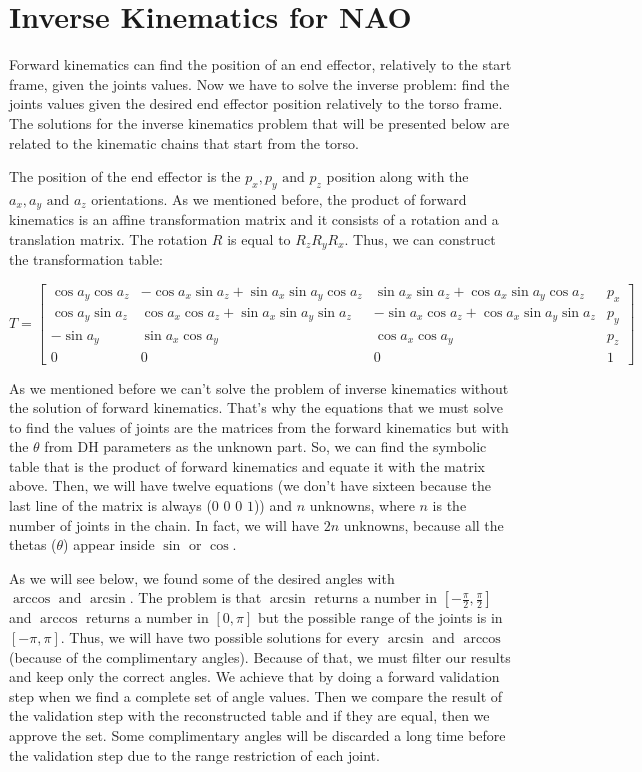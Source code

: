 \section{Inverse Kinematics for NAO}


Forward kinematics can find the position of an end effector, relatively to the start frame, given the joints values. Now we have to solve the inverse problem: find the joints values given the desired end effector position relatively to the torso frame. The solutions for the inverse kinematics problem that will be presented below are related to the kinematic chains that start from the torso.

The position of the end effector is the $p_x,p_y\text{ and }p_z$ position along with the $a_x,a_y\text{ and }a_z$ orientations. As we mentioned before, the product of forward kinematics is an affine transformation matrix and it consists of a rotation and a translation matrix. The rotation $R$ is equal to $R_zR_yR_x$. Thus, we can construct the transformation table:

\begin{small}
\[
T = 
\begin{bmatrix}
\cos a_y\cos a_z & -\cos a_x\sin a_z + \sin a_x\sin a_y\cos a_z & \sin a_x\sin a_z + \cos a_x\sin a_y\cos a_z & p_x\\
\cos a_y\sin a_z & \cos a_x\cos a_z + \sin a_x\sin a_y\sin a_z & -\sin a_x\cos a_z + \cos a_x\sin a_y\sin a_z & p_y\\
-\sin a_y & \sin a_x\cos a_y & \cos a_x\cos a_y & p_z\\
0 & 0 & 0 & 1
\end{bmatrix}
\]
\end{small}
As we mentioned before we can't solve the problem of inverse kinematics without the solution of forward kinematics. That's why the equations that we must solve to find the values of joints are the matrices from the forward kinematics but with the $\theta$ from DH parameters as the unknown part. So, we can find the symbolic table that is the product of forward kinematics and equate it with the matrix above. Then, we will have twelve equations (we don't have sixteen because the last line of the matrix is always ($0$ $0$ $0$ $1$)) and $n$ unknowns, where $n$ is the number of joints in the chain. In fact, we will have $2n$ unknowns, because all the thetas ($\theta$) appear inside $\sin$ or $\cos$.

As we will see below, we found some of the desired angles with $\arccos \text{ and }\arcsin$. The problem is that $\arcsin$ returns a number in $\left[-\tfrac{\pi}{2},\tfrac{\pi}{2}\right]$ and $\arccos$ returns a number in $\left[0,\pi\right]$ but the possible range of the joints is in $\left[-\pi,\pi\right]$. Thus, we will have two possible solutions for every $\arcsin$ and $\arccos$ (because of the complimentary angles). Because of that, we must filter our results and keep only the correct angles. We achieve that by doing a forward validation step when we find a complete set of angle values. Then we compare the result of the validation step with the reconstructed table and if they are equal, then we approve the set. Some complimentary angles will be discarded a long time before the validation step due to the range restriction of each joint.

